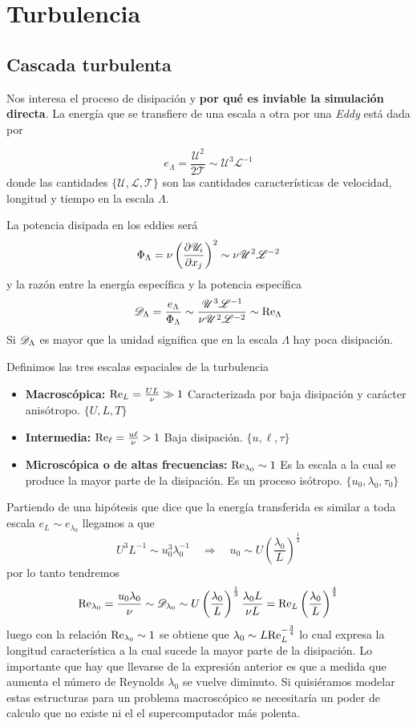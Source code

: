 
\section{Turbulencia}

\subsection{Cascada turbulenta}
Nos interesa el proceso de disipación y \textbf{por qué es inviable la simulación directa}. La energía que se transfiere de una escala a otra por una \textit{Eddy} está dada por 

\[
e_{\Lambda}=\frac{\mathscr{U}^2}{2 \mathscr{T}} \sim \mathscr{U}^3 \mathscr{L}^{-1}
\]
donde las cantidades $\{ \mathscr{U},\mathscr{L},\mathscr{T}\}$ son las cantidades características de velocidad, longitud y tiempo en la escala $\Lambda$.

La potencia disipada en los eddies será
\[
\Phi_\Lambda =\nu \left( \frac{\partial \mathscr{U}_i}{\partial x_j} \right)^2 \sim \nu \mathscr{U}^2 \mathscr{L}^{-2}
\]
y la razón entre la energía específica y la potencia específica
\[
\mathscr{D}_\Lambda = \frac{e_\Lambda}{\Phi_\Lambda} \sim \frac{\mathscr{U}^3 \mathscr{L}^{-1}}{\nu \mathscr{U}^2\mathscr{L}^{-2}}\sim \textrm{Re}_\Lambda
\]
Si $\mathscr{D}_\Lambda$ es mayor que la unidad significa que en la escala $\Lambda$ hay poca disipación.

Definimos las tres escalas espaciales de la turbulencia

\begin{itemize}
    \item \textbf{Macroscópica:} $\textrm{Re}_L=\frac{UL}{\nu}\gg 1$ Caracterizada por baja disipación y carácter anisótropo. $\{ U,L,T\}$
    \item \textbf{Intermedia:} $\textrm{Re}_\ell = \frac{u\ell}{\nu}>1$ Baja disipación. $\{ u,\ell,\tau \}$
    \item \textbf{Microscópica o de altas frecuencias:} $\textrm{Re}_{\lambda_0}\sim 1$ Es la escala a la cual se produce la mayor parte de la disipación. Es un proceso isótropo. $\{ u_0,\lambda_0,\tau_0 \}$
\end{itemize}

Partiendo de una hipótesis que dice que la energía transferida es similar a toda escala $e_L\sim e_{\lambda_0}$ llegamos a que 
\[
U^3L^{-1}\sim u_0^3\lambda_0^{-1} \quad \Rightarrow\quad u_0\sim U \left(\frac{\lambda_0}{L} \right)^{\frac{1}{3}}
\]
por lo tanto tendremos
\[
\textrm{Re}_{\lambda_0}=\frac{u_0 \lambda_0}{\nu}\sim \mathscr{D}_{\lambda_0}\sim U \left(\frac{\lambda_0}{L} \right)^{\frac{1}{3}} \frac{\lambda_0 L}{\nu L}=\textrm{Re}_L \left(\frac{\lambda_0}{L}\right)^{\frac{4}{3}}
\]
luego con la relación $\textrm{Re}_{\lambda_0}\sim 1 $ se obtiene que $\lambda_0\sim L \textrm{Re}_L^{-\frac{3}{4}}$ lo cual expresa la longitud característica a la cual sucede la mayor parte de la disipación. Lo importante que hay que llevarse de la expresión anterior es que a medida que aumenta el número de Reynolds $\lambda_0$ se vuelve diminuto. Si quisiéramos modelar estas estructuras para un problema macroscópico se necesitaría un poder de calculo que no existe ni el el supercomputador más polenta.

